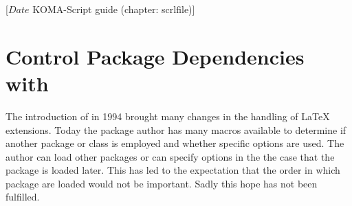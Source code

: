 %
%
%
%
%
%
%
%
% 
%
%
%
%

                 [$Date$
                  KOMA-Script guide (chapter: scrlfile)]


\chapter{Control Package Dependencies with }


The introduction of {\LaTeXe} in 1994 brought many changes in the
handling of {\LaTeX} extensions.  Today the package author has many
macros available to determine if another package or class is
employed and whether specific options are used.  The author can load
other packages or can specify options in the the case that the
package is loaded later.  This has led to the expectation that the
order in which package are loaded would not be important.  Sadly
this hope has not been fulfilled.


